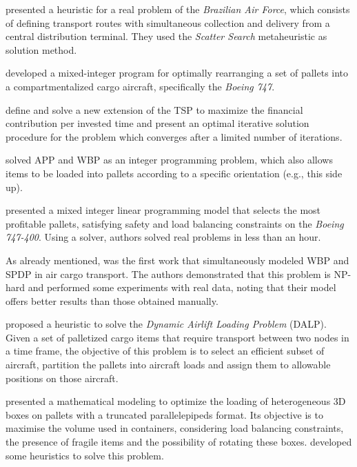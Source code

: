 \documentclass[preprint,authoryear]{elsarticle}
\begin{document}
\cite{MesquitaCunha2011} presented a heuristic for a real problem of the {\it Brazilian Air Force}, which consists of defining transport routes with simultaneous collection and delivery from a central distribution terminal. They used the {\it Scatter Search} metaheuristic as solution method.

\cite{Limbourg2012} developed a mixed-integer program for optimally rearranging a set of pallets into a compartmentalized cargo aircraft, specifically the {\it Boeing 747}.

\cite{kaspi2019} define and solve a new extension of the TSP to maximize the financial contribution per invested time and present an optimal iterative solution procedure for the problem which converges after a limited number of iterations.

\cite{RoesenerHall2014} solved APP and WBP as an integer programming problem, which also allows items to be loaded into pallets according to a specific orientation (e.g., this side up).

\cite{Vancroonemburg2014} presented a mixed integer linear programming model that selects the most profitable pallets, satisfying safety and load balancing constraints on the {\it Boeing 747-400}. Using a solver, authors solved real problems in less than an hour.

As already mentioned, \cite{LurkinSchyns2015} was the first work that simultaneously modeled WBP and SPDP in air cargo transport. The authors demonstrated that this problem is NP-hard and performed some experiments with real data, noting that their model offers better results than those obtained manually.

\cite{RoesenerBarnes2016} proposed a heuristic to solve the {\it Dynamic Airlift Loading Problem} (DALP). Given a set of palletized cargo items that require transport between two nodes in a time frame, the objective of this problem is to select an efficient subset of aircraft, partition the pallets into aircraft loads and assign them to allowable positions on those aircraft.

\cite{PaquaySchynsLimbourg2016} presented a mathematical modeling to optimize the loading of heterogeneous 3D boxes on pallets with a truncated parallelepipeds format. Its objective is to maximise the volume used in containers, considering load balancing constraints, the presence of fragile items and the possibility of rotating these boxes. \cite{PaquayLimbourgSchynsOliveira2018} developed some heuristics to solve this problem.
\end{document}
